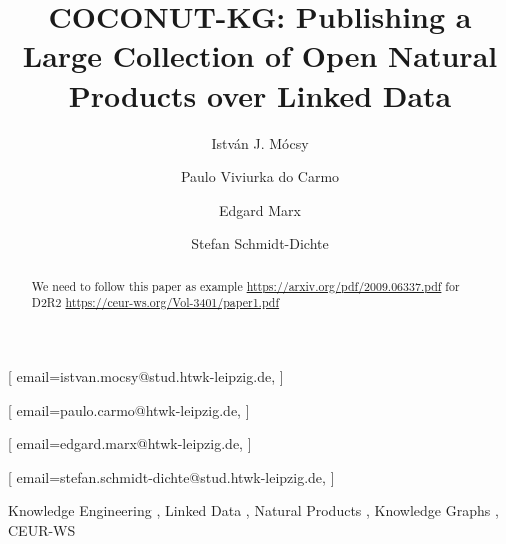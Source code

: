 \documentclass[
]{ceurart}
\begin{document}


\title{COCONUT-KG: Publishing a Large Collection of Open Natural Products over Linked Data}


\author[1]{István J. Mócsy}[%
email=istvan.mocsy@stud.htwk-leipzig.de,
]
\cormark[1]
\address[1]{AKSW, Leipzig University of Applied Sciences (HTWK),
  Gustav-Freytag-Straße 42a, Leipzig, 04277, Germany}

\author[1]{Paulo Viviurka do Carmo}[%
email=paulo.carmo@htwk-leipzig.de,
]

\author[1]{Edgard Marx}[%
email=edgard.marx@htwk-leipzig.de,
]

\author[1]{Stefan Schmidt-Dichte}[%
email=stefan.schmidt-dichte@stud.htwk-leipzig.de,
]





\begin{abstract}
We need to follow this paper as example \url{https://arxiv.org/pdf/2009.06337.pdf} for D2R2 \url{https://ceur-ws.org/Vol-3401/paper1.pdf}
\end{abstract}

\begin{keywords}
  Knowledge Engineering \sep
  Linked Data \sep
  Natural Products \sep
  Knowledge Graphs \sep
  CEUR-WS
\end{keywords}

\maketitle
\end{document}
